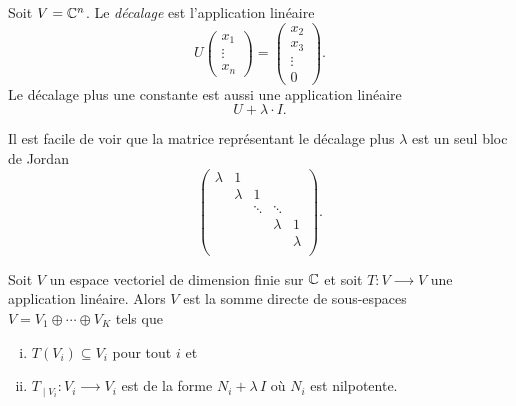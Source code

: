 \begin{definition}
  \label{def:36}
  Soit $V  = \mathbb{C}^n$. Le \emph{décalage}  est l'application linéaire 
  \begin{displaymath}
    U
    \begin{pmatrix}
      x_1 \\ \vdots \\ x_n
    \end{pmatrix}
     = 
     \begin{pmatrix}
       x_2 \\ x_3 \\ \vdots \\ 0
     \end{pmatrix}. 
  \end{displaymath}
  Le décalage plus une constante est aussi une application linéaire 
  \begin{displaymath}
    U + \lambda \cdot I. 
  \end{displaymath}
\end{definition}

Il est facile de voir que la matrice représentant le décalage plus $λ$ est 
un seul bloc de Jordan 
\begin{displaymath}
 \begin{pmatrix}
      λ & 1 \\
        & λ & 1 \\
        &   & \ddots & \ddots \\ 
        &   &             & λ & 1 \\
        &   &         &  & λ  \\
    \end{pmatrix}.   
\end{displaymath}



\begin{lemma}
  \label{lem:19}
  Soit $V$ un espace vectoriel de dimension finie sur $\mathbb{C}$ et soit $T\colon V ⟶ V$ une application linéaire. Alors $V$ est la somme directe de sous-espaces   $V = V_1 ⊕ \cdots ⊕ V_K$  tels que 
  \begin{enumerate}[i)]
  \item $T(V_i) ⊆ V_i$ pour tout $i$ et \label{item:10}
  \item $T_{∣V_i} \colon V_i ⟶ V_i$
    est de la forme $N_i + λ \, I$ où $N_i$ est nilpotente. \label{item:11}
  \end{enumerate}
\end{lemma}

